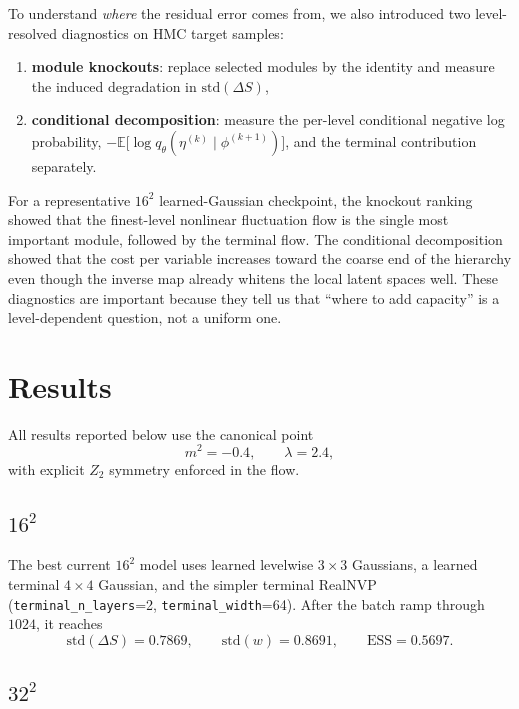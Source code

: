 \documentclass[aps,prd,preprint,nofootinbib,superscriptaddress,longbibliography]{revtex4-2}
\newcommand{\std}{\mathrm{std}}
\newcommand{\ESS}{\mathrm{ESS}}
\begin{document}
To understand \emph{where} the residual error comes from, we also introduced two
level-resolved diagnostics on HMC target samples:
\begin{enumerate}
\item \textbf{module knockouts}: replace selected modules by the identity and
measure the induced degradation in $\std(\Delta S)$,
\item \textbf{conditional decomposition}: measure the per-level conditional
negative log probability,
\(
-\mathbb{E}\bigl[\log q_\theta(\eta^{(k)}\mid \phi^{(k+1)})\bigr]
\),
and the terminal contribution separately.
\end{enumerate}

For a representative $16^2$ learned-Gaussian checkpoint, the knockout ranking
showed that the finest-level nonlinear fluctuation flow is the single most
important module, followed by the terminal flow. The conditional decomposition
showed that the cost per variable increases toward the coarse end of the
hierarchy even though the inverse map already whitens the local latent spaces
well. These diagnostics are important because they tell us that ``where to add
capacity'' is a level-dependent question, not a uniform one.

\section{Results}
\label{sec:results}

All results reported below use the canonical point
\begin{equation}
m^2=-0.4,\qquad \lambda=2.4,
\end{equation}
with explicit $Z_2$ symmetry enforced in the flow.

\subsection{$16^2$}

The best current $16^2$ model uses learned levelwise $3\times3$ Gaussians,
a learned terminal $4\times4$ Gaussian, and the simpler terminal RealNVP
(\texttt{terminal\_n\_layers}=2, \texttt{terminal\_width}=64). After the batch
ramp through $1024$, it reaches
\begin{equation}
\std(\Delta S)=0.7869,\qquad
\std(w)=0.8691,\qquad
\ESS=0.5697.
\end{equation}

\subsection{$32^2$}
\end{document}
